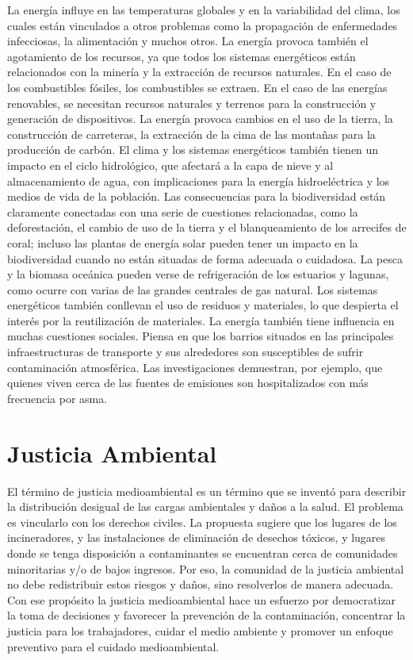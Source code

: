 \documentclass{article}
\begin{document}
La energía influye en las temperaturas globales y en la variabilidad del clima, los cuales están vinculados a otros problemas como la propagación de enfermedades infecciosas, la alimentación y muchos otros. La energía provoca también el agotamiento de los recursos, ya que todos los sistemas energéticos están relacionados con la minería y la extracción de recursos naturales. En el caso de los combustibles fósiles, los combustibles se extraen. En el caso de las energías renovables, se necesitan recursos naturales y terrenos para la construcción y generación de dispositivos. La energía provoca cambios en el uso de la tierra, la construcción de carreteras, la extracción de la cima de las montañas para la producción de carbón. 
El clima y los sistemas energéticos también tienen un impacto en el ciclo hidrológico, que afectará a la capa de nieve y al almacenamiento de agua, con implicaciones para la energía hidroeléctrica y los medios de vida de la población. Las consecuencias para la biodiversidad están claramente conectadas con una serie de cuestiones relacionadas, como la deforestación, el cambio de uso de la tierra y el blanqueamiento de los arrecifes de coral; incluso las plantas de energía solar pueden tener un impacto en la biodiversidad cuando no están situadas de forma adecuada o cuidadosa.  La pesca y la biomasa oceánica pueden verse 
de refrigeración de los estuarios y lagunas, como ocurre con varias de las grandes centrales de gas natural. Los sistemas energéticos también conllevan el uso de residuos y materiales, lo que despierta el interés por la reutilización de materiales.
La energía también tiene influencia en muchas cuestiones sociales. Piensa en que los barrios situados en las principales infraestructuras de transporte y sus alrededores son susceptibles de sufrir contaminación atmosférica.
Las investigaciones demuestran, por ejemplo, que quienes viven cerca de las fuentes de emisiones son hospitalizados con más frecuencia por asma. 


\section{Justicia Ambiental} 

El término de justicia medioambiental es un término que se inventó para describir la distribución desigual de las cargas ambientales y daños a la salud. El problema es vincularlo con los derechos civiles. La propuesta sugiere que los lugares de los incineradores, y las instalaciones de eliminación de desechos tóxicos, y lugares donde se tenga disposición a contaminantes se encuentran cerca de comunidades minoritarias y/o de bajos ingresos. Por eso, la comunidad de la justicia ambiental no debe redistribuir estos riesgos y daños, sino resolverlos de manera adecuada. Con ese propósito la justicia medioambiental hace un esfuerzo por democratizar la toma de decisiones y favorecer la prevención de la contaminación, concentrar la justicia para los trabajadores, cuidar el medio ambiente y promover un enfoque preventivo para el cuidado medioambiental.
\end{document}
